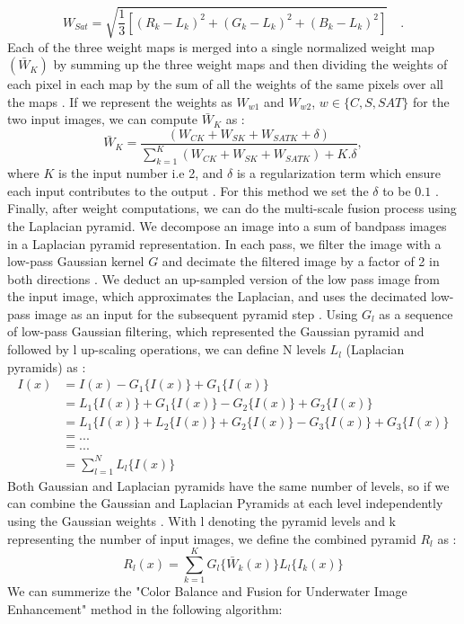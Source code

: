 \documentclass[a4paper,11pt,oneside]{article}
\begin{document}
   $${W}_{Sat}=\sqrt {\frac{1}{3}\left [{(R_{k}\!-\!L_{k})^{2}\!+\!(G_{k}\!-\!L_{k})^{2}\!+\!(B_{k}\!-\!L_{k})^{2}}\right ]}\quad.$$
   Each of the three weight maps is merged into a single normalized weight map $(\bar W_K)$ by summing up the three weight maps and then dividing the weights of each pixel in each map by the sum of all the weights of the same pixels over all the maps \cite{16}. If we represent the weights as $W_{w1}$ and $W_{w2}$, $w \in \{C, S, SAT\}$ for the two input images, we can compute $\bar W_K$ as \cite{16}:
  $$\bar W_K = \frac{(W_{CK} + W_{SK} + W_{SATK} + \delta)}{\sum_{k=1}^{K} (W_{CK} + W_{SK} + W_{SATK}) + K.\delta},$$
  where $K$ is the input number i.e 2, and $\delta$ is a regularization term which ensure each input contributes to the output \cite{16}. For this method we set the $\delta$ to be $0.1$ \cite{16}.\\
  Finally, after weight computations, we can do the multi-scale fusion process using the Laplacian pyramid. We decompose an image into a sum of bandpass images in a Laplacian pyramid representation. In each pass, we filter the image with a low-pass Gaussian kernel $G$ and decimate the filtered image by a factor of 2 in both directions \cite{16}. We deduct an up-sampled version of the low pass image from the input image, which approximates the Laplacian, and uses the decimated low-pass image as an input for the subsequent pyramid step \cite{16}. Using $G_l$ as a sequence of low-pass Gaussian filtering, which represented the Gaussian pyramid and followed by l up-scaling operations, we can define N levels $L_l$ (Laplacian pyramids) as \cite{16}:
  \begin{align*}
  I(x) &= I(x) - G_1\{I(x)\} + G_1\{I(x)\}\\
  &= L_1\{I(x)\} + G_1\{I(x)\} - G_2\{I(x)\} + G_2\{I(x)\}\\
  &= L_1\{I(x)\} + L_2\{I(x)\} + G_2\{I(x)\} - G_3\{I(x)\} + G_3\{I(x)\}\\
  &= ...\\
  &= ...\\
  &= \sum_{l=1}^{N} L_l\{I(x)\}
  \end{align*}
  Both Gaussian and Laplacian pyramids have the same number of levels, so if we can combine the Gaussian and Laplacian Pyramids at each level independently using the Gaussian weights \cite{16}. With l denoting the pyramid levels and k representing the number of input images, we define  the combined pyramid $R_l$ as \cite{16}:
  $$R_l(x) = \sum_{k=1}^K G_l\{\bar W_k(x)\}L_l\{I_k(x)\}$$
  We can summerize the "Color Balance and Fusion for Underwater Image Enhancement" method in the following algorithm:
\end{document}

